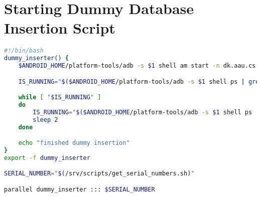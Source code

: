 \chapter{Starting Dummy Database Insertion Script}\label{app:start_wait_db_inserter_parallel}
\begin{lstlisting}[language=bash,caption=Script that starts and waits for the dummy database insertion app in parallel on all connected devices,label=lst:start_wait_db_inserter_parallel]
#!/bin/bash
dummy_inserter() {
    $ANDROID_HOME/platform-tools/adb -s $1 shell am start -n dk.aau.cs.giraf.dummydbinserter/dk.aau.cs.giraf.dummydbinserter.MainActivity

    IS_RUNNING="$($ANDROID_HOME/platform-tools/adb -s $1 shell ps | grep dk.aau.cs.giraf.dummydbinserter)"

    while [ "$IS_RUNNING" ]
    do
        IS_RUNNING="$($ANDROID_HOME/platform-tools/adb -s $1 shell ps | grep dk.aau.cs.giraf.dummydbinserter)"
        sleep 2
    done

    echo "finished dummy insertion"
}
export -f dummy_inserter

SERIAL_NUMBER="$(/srv/scripts/get_serial_numbers.sh)"

parallel dummy_inserter ::: $SERIAL_NUMBER
\end{lstlisting}